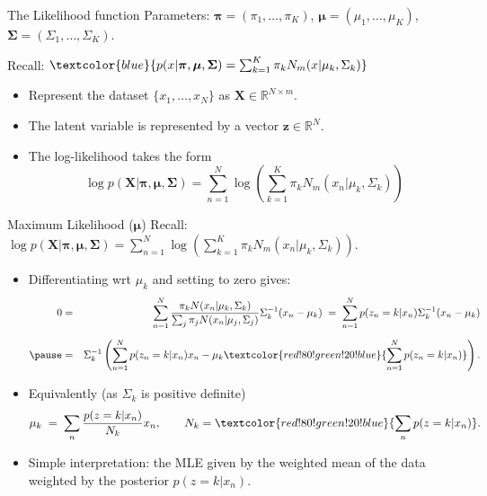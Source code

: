 \documentclass[11pt,handout,aspectratio=169]{beamer}
\begin{document}
\begin{frame}{The Likelihood function}
Parameters: $\boldsymbol\pi=(\pi_1,\ldots,\pi_K)$, $\boldsymbol\mu=(\mu_1,\ldots,\mu_K)$, $\boldsymbol\Sigma=(\Sigma_1,\ldots,\Sigma_K)$.

Recall: $\textcolor{blue}{p(x|\boldsymbol\pi,\boldsymbol\mu,\boldsymbol\Sigma)=\sum_{k=1}^K \pi_k N_m(x|\mu_k,\Sigma_k)}$
\medskip

\begin{itemize}
	\item Represent the dataset $\{x_1,\ldots,x_N\}$ as $\boldsymbol X\in \mathbb R^{N\times m}$.
	\item The latent variable is represented by a vector $\boldsymbol z\in \mathbb R^N$.
	\item The log-likelihood takes the form $$\log p(\boldsymbol X|\boldsymbol\pi,\boldsymbol\mu,\boldsymbol\Sigma)=\sum_{n=1}^N\log\left(\sum_{k=1}^K\pi_k N_m(x_n|\mu_k,\Sigma_k)\right)$$
\end{itemize}
\end{frame}

\begin{frame}{Maximum Likelihood ($\boldsymbol \mu$)}
Recall: $\log p(\boldsymbol X|\boldsymbol\pi,\boldsymbol\mu,\boldsymbol\Sigma)=\sum_{n=1}^N\log\left(\sum_{k=1}^K\pi_k N_m(x_n|\mu_k,\Sigma_k)\right)$.
\begin{itemize}
	\item Differentiating wrt $\mu_k$ and setting to zero gives:
	\begin{eqnarray*}
		0&=&\sum_{n=1}^N\frac{\pi_k N(x_n|\mu_k,\Sigma_k)}{\sum_j \pi_j N(x_n|\mu_j,\Sigma_j)}\Sigma_k^{-1}(x_n-\mu_k)\;=\; \sum_{n=1}^N p(z_n=k|x_n)\Sigma_k^{-1}(x_n-\mu_k)\\[2mm]\pause
		&=&\Sigma_k^{-1}\left(\sum_{n=1}^N p(z_n=k|x_n)x_n-\mu_k\textcolor{red!80!green!20!blue}{\sum_{n=1}^N p(z_n=k|x_n)}\right).
	\end{eqnarray*} 	
	\item Equivalently (as $\Sigma_k$ is positive definite) $$\mu_k\;=\;\sum_n \frac{p(z=k|x_n)}{N_k}x_n,\qquad N_k=\textcolor{red!80!green!20!blue}{\sum_n p(z=k|x_n)}.$$
	\item Simple interpretation: the MLE given by the weighted mean of the data weighted by the posterior $p(z=k|x_n)$.
\end{itemize}
\end{frame}
\end{document}
